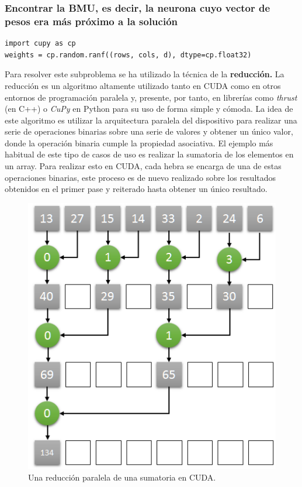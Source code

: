 \subsubsection{Encontrar la BMU, es decir, la neurona cuyo vector de pesos era más próximo a la solución}

\begin{code}
\begin{verbatim}
import cupy as cp
weights = cp.random.ranf((rows, cols, d), dtype=cp.float32)
\end{verbatim}
\label{code:cupyreduction}
\end{code}

Para resolver este subproblema se ha utilizado la técnica de la \textbf{reducción.} La reducción es un algoritmo altamente utilizado tanto en CUDA como en otros entornos de programación paralela y, presente, por tanto, en librerías como \textit{thrust} (en C++) o \textit{CuPy} en Python para su uso de forma simple y cómoda. La idea de este algoritmo es utilizar la arquitectura paralela del dispositivo para realizar una serie de operaciones binarias sobre una serie de valores y obtener un único valor, donde la operación binaria cumple la propiedad asociativa. El ejemplo más habitual de este tipo de casos de uso es realizar la sumatoria de los elementos en un array. Para realizar esto en CUDA, cada hebra se encarga de una de estas operaciones binarias, este proceso es de nuevo realizado sobre los resultados obtenidos en el primer pase y reiterado hasta obtener un único resultado. \\


\begin{figure}[ht]
\centering
\includegraphics[scale=0.5]{imagenes/parallel_reduce.png}
\caption{Una reducción paralela de una sumatoria en CUDA.}
\label{image:cudareduction}
\end{figure}


